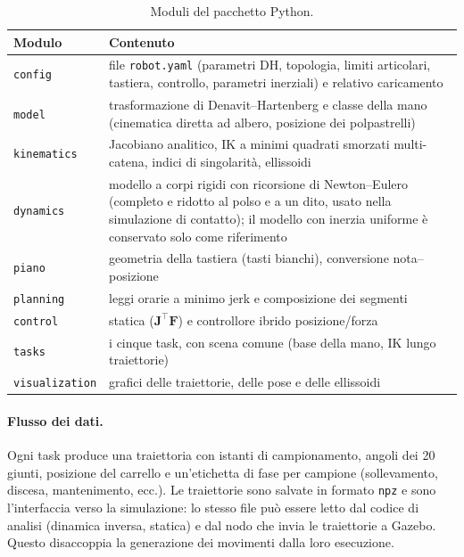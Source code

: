 \begin{table}[htbp]
    \centering
    \renewcommand{\arraystretch}{1.1}
    \begin{tabular}{|l|p{9.5cm}|}
        \hline
        \textbf{Modulo} & \textbf{Contenuto} \\ \hline \hline
        \texttt{config} & file \texttt{robot.yaml} (parametri DH, topologia, limiti articolari, tastiera, controllo, parametri inerziali) e relativo caricamento\\
        \texttt{model} & trasformazione di Denavit--Hartenberg e classe della mano (cinematica diretta ad albero, posizione dei polpastrelli)\\
        \texttt{kinematics} & Jacobiano analitico, IK a minimi quadrati smorzati multi-catena, indici di singolarità, ellissoidi\\
        \texttt{dynamics} & modello a corpi rigidi con ricorsione di Newton--Eulero (completo e ridotto al polso e a un dito, usato nella simulazione di contatto); il modello con inerzia uniforme è conservato solo come riferimento\\
        \texttt{piano} & geometria della tastiera (tasti bianchi), conversione nota--posizione\\
        \texttt{planning} & leggi orarie a minimo jerk e composizione dei segmenti\\
        \texttt{control} & statica ($\boldsymbol J^\top\boldsymbol F$) e controllore ibrido posizione/forza\\
        \texttt{tasks} & i cinque task, con scena comune (base della mano, IK lungo traiettorie)\\
        \texttt{visualization} & grafici delle traiettorie, delle pose e delle ellissoidi\\ \hline
    \end{tabular}
    \caption{Moduli del pacchetto Python.}
    \label{tab:moduli}
\end{table}

\paragraph{Flusso dei dati.} Ogni task produce una traiettoria con istanti di campionamento, angoli dei 20 giunti, posizione del carrello e un'etichetta di fase per campione (sollevamento, discesa, mantenimento, ecc.). Le traiettorie sono salvate in formato \texttt{npz} e sono l'interfaccia verso la simulazione: lo stesso file può essere letto dal codice di analisi (dinamica inversa, statica) e dal nodo che invia le traiettorie a Gazebo. Questo disaccoppia la generazione dei movimenti dalla loro esecuzione.


